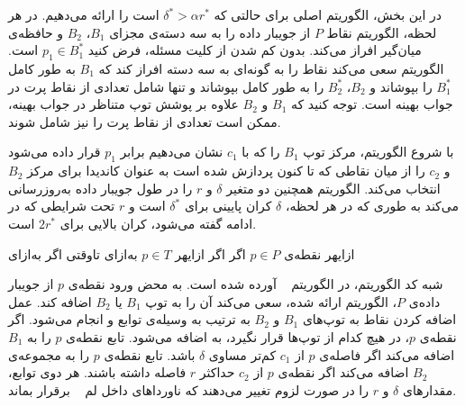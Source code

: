 


در این بخش، الگوریتم اصلی برای حالتی که $\delta^* > \alpha r^*$ است را ارائه می‌دهیم.
در هر لحظه، الگوریتم نقاط $P$ از جویبار داده را به سه دسته‌ی مجزای $B_1$، $B_2$ و حافظه‌ی میان‌گیر  افراز می‌کند.
بدون کم شدن از کلیت مسئله، فرض کنید $p_1 \in B_1^*$ است.
الگوریتم سعی می‌کند نقاط را به گونه‌ای به سه دسته افراز کند که $B_1$ به طور کامل $B_1^*$ را بپوشاند و $B_2$، $B_2^*$ را به طور کامل بپوشاند و  تنها شامل تعدادی از نقاط پرت در جواب بهینه است.
توجه کنید که $B_1$ و $B_2$ علاوه بر پوشش توپ متناظر در جواب بهینه، ممکن است تعدادی از نقاط پرت را نیز شامل شوند. 

با شروع الگوریتم، مرکز توپ $B_1$ را که با $c_1$ نشان می‌دهیم برابر $p_1$ قرار داده می‌شود و $c_2$ را از میان نقاطی که تا کنون پردازش شده است به عنوان کاندیدا برای مرکز $B_2$ انتخاب می‌کند.
الگوریتم همچنین دو متغیر $\delta$ و $r$ را در طول جویبار داده به‌روزرسانی می‌کند به طوری که در هر لحظه، $\delta$ کران پایینی برای $\delta^*$ است و $r$ تحت شرایطی که در ادامه گفته می‌شود، کران بالایی برای $2r^*$ است.
 
‌ازای{هر نقطه‌ی $p \in P$}
‌اگر{}
‌اگر{}
‌ازای{هر $p \in T$}
‌به‌ازای{}
‌تاوقتی{}
‌اگر{}
‌به‌ازای{}

شبه کد الگوریتم، در الگوریتم ~ آورده شده است.
به محض ورود نقطه‌ی $p$ از جویبار داده‌ی $P$، الگوریتم ارائه شده، سعی می‌کند آن را به توپ $B_1$ یا $B_2$ اضافه کند.
عمل اضافه کردن نقاط به توپ‌های $B_1$ و $B_2$ به ترتیب به وسیله‌ی توابع  و  انجام می‌شود.
اگر نقطه‌ی $p$، در هیچ کدام از توپ‌ها قرار نگیرد، به  اضافه می‌شود.
تابع  نقطه‌ی $p$ را به $B_1$ اضافه می‌کند اگر فاصله‌ی $p$ از $c_1$ کم‌تر مساوی $\delta$ باشد.
تابع  نقطه‌ی $p$ را به مجموعه‌ی $B_2$ اضافه می‌کند اگر نقطه‌ی $p$ از $c_2$ حداکثر $r$ فاصله داشته باشند.
هر دوی توابع، مقدارهای $\delta$ و $r$ را در صورت لزوم تغییر می‌دهند که ناورداهای داخل لم ~ برقرار بماند.

